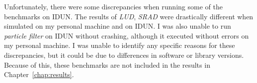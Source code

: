 Unfortunately, there were some discrepancies when running some of the benchmarks on IDUN. The results of \textit{LUD}, \textit{SRAD} were drastically different when simulated on my personal machine and on IDUN. I was also unable to run \textit{particle filter} on IDUN without crashing, although it executed without errors on my personal machine. I was unable to identify any specific reasons for these discrepancies, but it could be due to differences in software or library versions. Because of this, these benchmarks are not included in the results in Chapter~\ref{chap:results}.